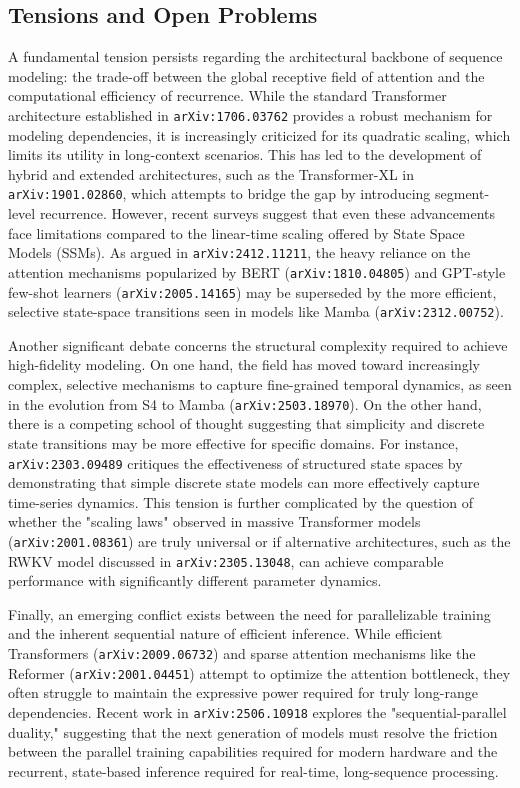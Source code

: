 \documentclass[11pt]{article}
\begin{document}
\subsection{Tensions and Open Problems}

A fundamental tension persists regarding the architectural backbone of sequence modeling: the trade-off between the global receptive field of attention and the computational efficiency of recurrence. While the standard Transformer architecture established in \texttt{arXiv:1706.03762} provides a robust mechanism for modeling dependencies, it is increasingly criticized for its quadratic scaling, which limits its utility in long-context scenarios. This has led to the development of hybrid and extended architectures, such as the Transformer-XL in \texttt{arXiv:1901.02860}, which attempts to bridge the gap by introducing segment-level recurrence. However, recent surveys suggest that even these advancements face limitations compared to the linear-time scaling offered by State Space Models (SSMs). As argued in \texttt{arXiv:2412.11211}, the heavy reliance on the attention mechanisms popularized by BERT (\texttt{arXiv:1810.04805}) and GPT-style few-shot learners (\texttt{arXiv:2005.14165}) may be superseded by the more efficient, selective state-space transitions seen in models like Mamba (\texttt{arXiv:2312.00752}).

Another significant debate concerns the structural complexity required to achieve high-fidelity modeling. On one hand, the field has moved toward increasingly complex, selective mechanisms to capture fine-grained temporal dynamics, as seen in the evolution from S4 to Mamba (\texttt{arXiv:2503.18970}). On the other hand, there is a competing school of thought suggesting that simplicity and discrete state transitions may be more effective for specific domains. For instance, \texttt{arXiv:2303.09489} critiques the effectiveness of structured state spaces by demonstrating that simple discrete state models can more effectively capture time-series dynamics. This tension is further complicated by the question of whether the "scaling laws" observed in massive Transformer models (\texttt{arXiv:2001.08361}) are truly universal or if alternative architectures, such as the RWKV model discussed in \texttt{arXiv:2305.13048}, can achieve comparable performance with significantly different parameter dynamics.

Finally, an emerging conflict exists between the need for parallelizable training and the inherent sequential nature of efficient inference. While efficient Transformers (\texttt{arXiv:2009.06732}) and sparse attention mechanisms like the Reformer (\texttt{arXiv:2001.04451}) attempt to optimize the attention bottleneck, they often struggle to maintain the expressive power required for truly long-range dependencies. Recent work in \texttt{arXiv:2506.10918} explores the "sequential-parallel duality," suggesting that the next generation of models must resolve the friction between the parallel training capabilities required for modern hardware and the recurrent, state-based inference required for real-time, long-sequence processing.
\end{document}
